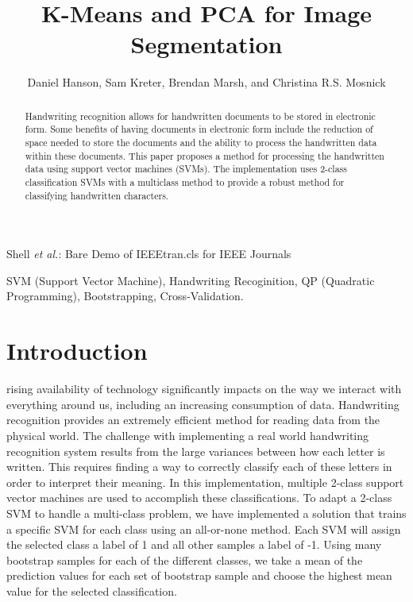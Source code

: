 \documentclass[journal]{IEEEtran}
\begin{document}
\title{K-Means and PCA for Image\\ Segmentation}


\author{Daniel Hanson, Sam Kreter, Brendan Marsh, and Christina R.S. Mosnick}

{Shell \MakeLowercase{\textit{et al.}}: Bare Demo of IEEEtran.cls for IEEE Journals}

\maketitle

\begin{abstract}
Handwriting recognition allows for handwritten documents to be stored in electronic form. Some benefits of having documents in electronic form include the reduction of space needed to store the documents and the ability to process the handwritten data within these documents. This paper proposes a method for processing the handwritten data using support vector machines (SVMs). The implementation uses 2-class classification SVMs with a multiclass method to provide a robust method for classifying handwritten characters.
\end{abstract}

\begin{IEEEkeywords}
    SVM (Support Vector Machine), Handwriting Recoginition, QP (Quadratic Programming), Bootstrapping, Cross-Validation.
\end{IEEEkeywords}

\IEEEpeerreviewmaketitle

\section{Introduction}

 rising availability of technology significantly impacts on the way we interact with everything around us, including an increasing consumption of data. Handwriting recognition provides an extremely efficient method for reading data from the physical world. The challenge with implementing a real world handwriting recognition system results from the large variances between how each letter is written. This requires finding a way to correctly classify each of these letters in order to interpret their meaning. In this implementation, multiple 2-class support vector machines are used to accomplish these classifications. To adapt a 2-class SVM to handle a multi-class problem, we have implemented a solution that trains a specific SVM for each class using an all-or-none method. Each SVM will assign the selected class a label of 1 and all other samples a label of -1. Using many bootstrap samples for each of the different classes, we take a mean of the prediction values for each set of bootstrap sample and choose the highest mean value for the selected classification.\\
\end{document}
